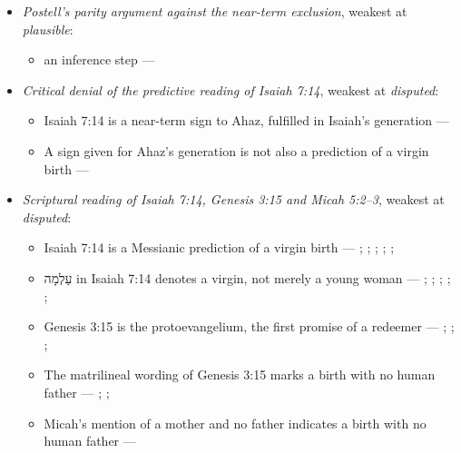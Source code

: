 \documentclass[11pt]{article}
\begin{document}
\begin{itemize}
\item \emph{Postell’s parity argument against the near-term exclusion}, weakest at \emph{plausible}:
\begin{itemize}
\item an inference step --- \cite[479--481]{postell-isaiah-messianic-2025}
\end{itemize}
\item \emph{Critical denial of the predictive reading of Isaiah 7:14}, weakest at \emph{disputed}:
\begin{itemize}
\item Isaiah 7:14 is a near-term sign to Ahaz, fulfilled in Isaiah’s generation --- \cite{brown-birth-messiah-1993}
\item A sign given for Ahaz’s generation is not also a prediction of a virgin birth --- \cite{brown-birth-messiah-1993}
\end{itemize}
\item \emph{Scriptural reading of Isaiah 7:14, Genesis 3:15 and Micah 5:2–3}, weakest at \emph{disputed}:
\begin{itemize}
\item Isaiah 7:14 is a Messianic prediction of a virgin birth --- \cite[ad loc. Isa 7:14]{motyer-isaiah-1993}; \cite[123]{motyer-context-content-1970}; \cite[12--14]{compton-immanuel-prophecy-2007}; \cite[66]{justin-dialogue-with-trypho-160}; \cite[III.21.6]{irenaeus-against-heresies-180}; \cite[I.35]{origen-against-celsus-248}
\item עַלְמָה in Isaiah 7:14 denotes a virgin, not merely a young woman --- \cite[ad loc. Isa 7:14]{motyer-isaiah-1993}; \cite[app. Isa 7:14]{bhs-1997}; \cite[1653--1654]{berry-virgin-birth-2003}; \cite[125]{motyer-context-content-1970}; \cite[7--8]{compton-immanuel-prophecy-2007}; \cite[I.32]{jerome-against-jovinianus-393}
\item Genesis 3:15 is the protoevangelium, the first promise of a redeemer --- \cite[167]{leupold-exposition-genesis-1942}; \cite[102]{keil-delitzsch-pentateuch-1866}; \cite{miravalle-meet-your-mother-2014}; \cite[318]{lewis-womans-seed-1991}
\item The matrilineal wording of Genesis 3:15 marks a birth with no human father --- \cite[298--299]{luther-on-the-creation-1904}; \cite{miravalle-meet-your-mother-2014}; \cite[ad loc. Gen 3:15]{henry-commentary-whole-bible}
\item Micah’s mention of a mother and no father indicates a birth with no human father --- \cite{miravalle-introduction-mary-2020}

\end{itemize}
\end{itemize}
\end{document}
